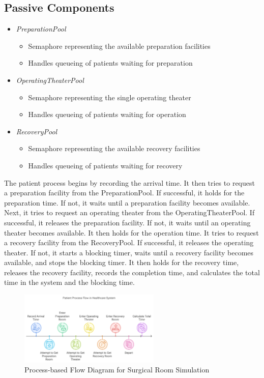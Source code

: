 \documentclass{article}
\begin{document}
\subsection{Passive Components}
\begin{itemize}
    \item \textit{PreparationPool}
    \begin{itemize}
        \item Semaphore representing the available preparation facilities
        \item Handles queueing of patients waiting for preparation
    \end{itemize}
    \item \textit{OperatingTheaterPool}
    \begin{itemize}
        \item Semaphore representing the single operating theater
        \item Handles queueing of patients waiting for operation
    \end{itemize}
    \item \textit{RecoveryPool}
    \begin{itemize}
        \item Semaphore representing the available recovery facilities
        \item Handles queueing of patients waiting for recovery
    \end{itemize}
\end{itemize}

The  patient process begins by recording the arrival time. It then tries to request a preparation facility from the PreparationPool. If successful, 
it holds for the preparation time. If not, it waits until a preparation facility becomes available. Next, it tries to request an operating theater 
from the OperatingTheaterPool. If successful, it releases the preparation facility. If not, it waits until an operating theater becomes available. 
It then holds for the operation time. It tries to request a recovery facility from the RecoveryPool. If successful, it releases the operating theater. 
If not, it starts a blocking timer, waits until a recovery facility becomes available, and stops the blocking timer. It then holds for the recovery time, 
releases the recovery facility, records the completion time, and calculates the total time in the system and the blocking time.

\begin{figure}[ht]
    \centering
    \includegraphics[width=0.6\textwidth]{static/process-based.png}
    \caption{Process-based Flow Diagram for Surgical Room Simulation}
    \label{fig:processflow}
\end{figure}
\end{document}
